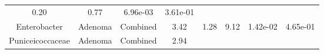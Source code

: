 \documentclass[12pt,]{article}
\begin{document}
\begin{longtable}[]{@{}cccccccc@{}}
\begin{minipage}[t]{0.13\columnwidth}
0.20\strut
\end{minipage} & \begin{minipage}[t]{0.13\columnwidth}\centering\strut
0.77\strut
\end{minipage} & \begin{minipage}[t]{0.07\columnwidth}\centering\strut
6.96e-03\strut
\end{minipage} & \begin{minipage}[t]{0.07\columnwidth}\centering\strut
3.61e-01\strut
\end{minipage}\tabularnewline
\begin{minipage}[t]{0.16\columnwidth}\centering\strut
Enterobacter\strut
\end{minipage} & \begin{minipage}[t]{0.08\columnwidth}\centering\strut
Adenoma\strut
\end{minipage} & \begin{minipage}[t]{0.09\columnwidth}\centering\strut
Combined\strut
\end{minipage} & \begin{minipage}[t]{0.05\columnwidth}\centering\strut
3.42\strut
\end{minipage} & \begin{minipage}[t]{0.13\columnwidth}\centering\strut
1.28\strut
\end{minipage} & \begin{minipage}[t]{0.13\columnwidth}\centering\strut
9.12\strut
\end{minipage} & \begin{minipage}[t]{0.07\columnwidth}\centering\strut
1.42e-02\strut
\end{minipage} & \begin{minipage}[t]{0.07\columnwidth}\centering\strut
4.65e-01\strut
\end{minipage}\tabularnewline
\begin{minipage}[t]{0.16\columnwidth}\centering\strut
Puniceicoccaceae\strut
\end{minipage} & \begin{minipage}[t]{0.08\columnwidth}\centering\strut
Adenoma\strut
\end{minipage} & \begin{minipage}[t]{0.09\columnwidth}\centering\strut
Combined\strut
\end{minipage} & \begin{minipage}[t]{0.05\columnwidth}\centering\strut
2.94\strut
\end{minipage} & \begin{minipage}[t]{0.13\columnwidth}\centering\strut

\end{minipage}
\end{longtable}
\end{document}
